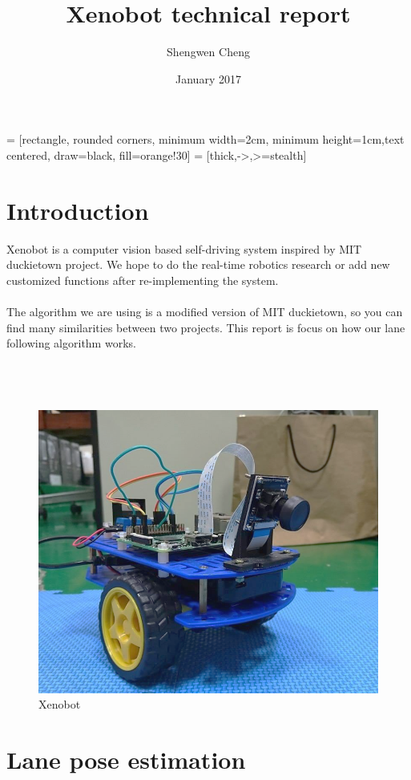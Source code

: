 \documentclass{article}
\title{Xenobot technical report}
\author{Shengwen Cheng}
\date{January 2017}
\begin{document}
\maketitle

 = [rectangle, rounded corners, minimum width=2cm, minimum height=1cm,text centered, draw=black, fill=orange!30]
 = [thick,->,>=stealth]

\section{Introduction}
Xenobot is a computer vision based self-driving system inspired by MIT duckietown project. We hope to do the real-time robotics research or add new customized functions after re-implementing the system.
\\
\\
The algorithm we are using is a modified version of MIT duckietown, so you can find many similarities between two projects. This report is focus on how our lane following algorithm works.
\\
\\
\\
\\

\begin{figure} [h!]
  \centering\includegraphics[scale=0.3]{xenobot.png}
  \caption{Xenobot}
\end{figure}


\section{Lane pose estimation}
\end{document}
